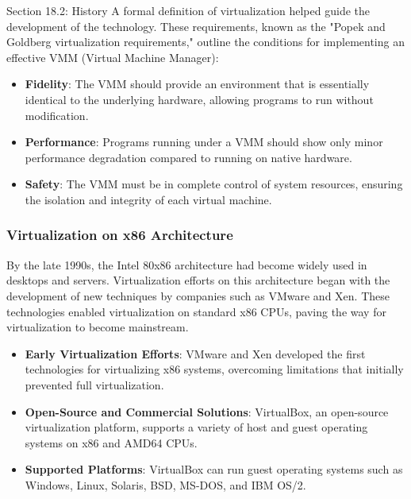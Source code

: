 \begin{notes}{Section 18.2: History}
    A formal definition of virtualization helped guide the development of the technology. These requirements, known as the "Popek and Goldberg virtualization requirements," outline the conditions for implementing an effective VMM (Virtual Machine Manager):
    
    \begin{highlight}
    
        \begin{itemize}
            \item \textbf{Fidelity}: The VMM should provide an environment that is essentially identical to the underlying hardware, allowing programs to run without modification.
            \item \textbf{Performance}: Programs running under a VMM should show only minor performance degradation compared to running on native hardware.
            \item \textbf{Safety}: The VMM must be in complete control of system resources, ensuring the isolation and integrity of each virtual machine.
        \end{itemize}
    
    \end{highlight}
    
    \subsubsection*{Virtualization on x86 Architecture}
    
    By the late 1990s, the Intel 80x86 architecture had become widely used in desktops and servers. Virtualization efforts on this architecture began with the development of new techniques by companies such as VMware and Xen. These technologies enabled virtualization on standard x86 CPUs, paving the way for virtualization to become mainstream.
    
    \begin{highlight}
    
        \begin{itemize}
            \item \textbf{Early Virtualization Efforts}: VMware and Xen developed the first technologies for virtualizing x86 systems, overcoming limitations that initially prevented full virtualization.
            \item \textbf{Open-Source and Commercial Solutions}: VirtualBox, an open-source virtualization platform, supports a variety of host and guest operating systems on x86 and AMD64 CPUs.
            \item \textbf{Supported Platforms}: VirtualBox can run guest operating systems such as Windows, Linux, Solaris, BSD, MS-DOS, and IBM OS/2.
        \end{itemize}
    

\end{highlight}
\end{notes}
